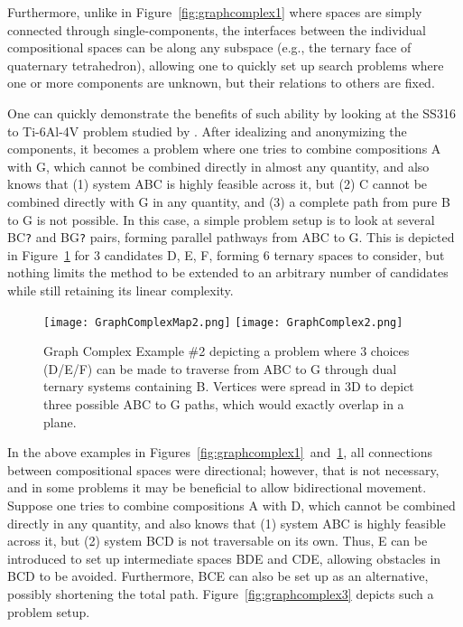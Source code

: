 Furthermore, unlike in Figure~\ref{fig:graphcomplex1} where spaces are simply connected through single-components, the interfaces between the individual compositional spaces can be along any subspace (e.g., the ternary face of quaternary tetrahedron), allowing one to quickly set up search problems where one or more components are unknown, but their relations to others are fixed. 

One can quickly demonstrate the benefits of such ability by looking at the SS316 to Ti-6Al-4V problem studied by \citet{Bobbio2022DesignCompositions}. After idealizing and anonymizing the components, it becomes a problem where one tries to combine compositions A with G, which cannot be combined directly in almost any quantity, and also knows that (1) system ABC is highly feasible across it, but (2) C cannot be combined directly with G in any quantity, and (3) a complete path from pure B to G is not possible. In this case, a simple problem setup is to look at several BC\texttt{?} and BG\texttt{?} pairs, forming parallel pathways from ABC to G. This is depicted in Figure~\ref{fig:graphcomplex2} for 3 candidates D, E, F, forming 6 ternary spaces to consider, but nothing limits the method to be extended to an arbitrary number of candidates while still retaining its linear complexity.

\begin{figure}[h]
    \centering
    \texttt{[image: GraphComplexMap2.png]}
    \texttt{[image: GraphComplex2.png]}
    \caption{Graph Complex Example \#2 depicting a problem where 3 choices (D/E/F) can be made to traverse from ABC to G through dual ternary systems containing B. Vertices were spread in 3D to depict three possible ABC to G paths, which would exactly overlap in a plane.} 
    \label{fig:graphcomplex2}
\end{figure}

In the above examples in Figures~\ref{fig:graphcomplex1}~and~\ref{fig:graphcomplex2}, all connections between compositional spaces were directional; however, that is not necessary, and in some problems it may be beneficial to allow bidirectional movement. Suppose one tries to combine compositions A with D, which cannot be combined directly in any quantity, and also knows that (1) system ABC is highly feasible across it, but (2) system BCD is not traversable on its own. Thus, E can be introduced to set up intermediate spaces BDE and CDE, allowing obstacles in BCD to be avoided. Furthermore, BCE can also be set up as an alternative, possibly shortening the total path. Figure~\ref{fig:graphcomplex3} depicts such a problem setup.

